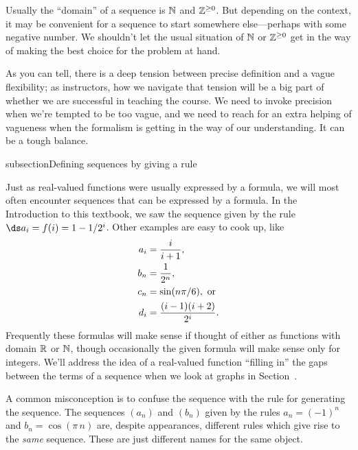 \documentclass{ximera}
\begin{document}
\begin{warning}
  Usually the ``domain'' of a sequence is $\mathbb N$ and $\mathbb Z^{\ge 0}$.  But
  depending on the context, it may be convenient for a sequence to
  start somewhere else---perhaps with some negative number.  We
  shouldn't let the usual situation of $\mathbb N$ or $\mathbb Z^{\ge 0}$ get in the
  way of making the best choice for the problem at hand.
\end{warning}

As you can tell, there is a deep tension between precise definition
and a vague flexibility; as instructors, how we navigate that tension
will be a big part of whether we are successful in teaching the
course.  We need to invoke precision when we're tempted to be too
vague, and we need to reach for an extra helping of vagueness when the
formalism is getting in the way of our understanding.  It can be a
tough balance.




subsection{Defining sequences by giving a rule}

Just as real-valued functions were usually expressed by a formula, we
will most often encounter sequences that can be expressed by a
formula.  In the Introduction to this textbook, we saw the sequence
given by the rule $\ds a_i=f(i)=1-1/2^i$.  Other examples are easy to
cook up, like
\begin{align*}
  a_i &={i\over i+1}, \\
  b_n &={1\over2^n}, \\
  c_n &=\sin(n\pi/6), \mbox{ or} \\
  d_i &={(i-1)(i+2)\over2^i}. \\
\end{align*}
Frequently these formulas will make sense if thought of either as
functions with domain $\mathbb R$ or $\mathbb N$, though occasionally the given
formula will make sense only for integers.  We'll address the
idea of a real-valued function ``filling in'' the gaps between the
terms of a sequence when we look at graphs in
Section~.

\begin{warning}
  A common misconception is to confuse the sequence with the rule for
  generating the sequence.  The sequences $(a_n)$ and $(b_n)$ given by
  the rules $a_n = (-1)^n$ and $b_n = \cos (\pi \, n)$ are, despite
  appearances, different rules which give rise to the \textit{same}
  sequence.  These are just different names for the same object.
\end{warning}
\end{document}
